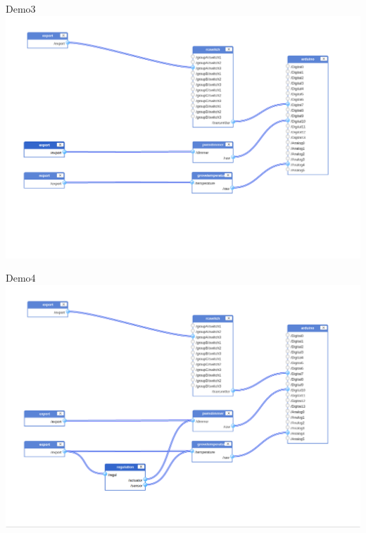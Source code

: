\documentclass{beamer}
\begin{document}
\begin{frame}{Demo3}
\includegraphics[width=\columnwidth]{figures/config3.png}
\end{frame}

\begin{frame}{Demo4}
\includegraphics[width=\columnwidth]{figures/config4.png}

\end{frame}
\end{document}

